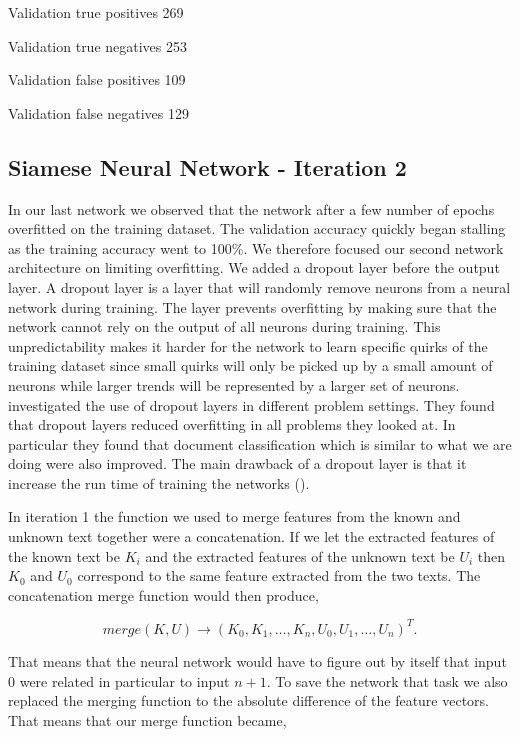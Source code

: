 Validation true positives 269

Validation true negatives 253

Validation false positives 109

Validation false negatives 129


\subsection{Siamese Neural Network - Iteration 2}


In our last network we observed that the network after a few number of epochs
overfitted on the training dataset. The validation accuracy quickly began
stalling as the training accuracy went to 100\%. We therefore focused our
second network architecture on limiting overfitting. We added a dropout layer
before the output layer. A dropout layer is a layer that will randomly remove
neurons from a neural network during training. The layer prevents overfitting
by making sure that the network cannot rely on the output of all neurons during
training. This unpredictability makes it harder for the network to learn
specific quirks of the training dataset since small quirks will only be picked
up by a small amount of neurons while larger trends will be represented by a
larger set of neurons. \cite{JMLR:v15:srivastava14a} investigated the use of
dropout layers in different problem settings. They found that dropout layers
reduced overfitting in all problems they looked at. In particular they found
that document classification which is similar to what we are doing were also
improved. The main drawback of a dropout layer is that it increase the run time
of training the networks (\cite{JMLR:v15:srivastava14a}).

In iteration 1 the function we used to merge features from the known and unknown
text together were a concatenation. If we let the extracted features of the
known text be $K_i$ and the extracted features of the unknown text be $U_i$ then
$K_0$ and $U_0$ correspond to the same feature extracted from the two texts. The
concatenation merge function would then produce,

\begin{equation}
    merge(K, U) \rightarrow \left(
        K_0, K_1, \dots, K_n, U_0, U_1, \dots, U_n
    \right)^T.
\end{equation}

That means that the neural network would have to figure out by itself that input
$0$ were related in particular to input $n + 1$. To save the network that task
we also replaced the merging function to the absolute difference of the feature
vectors. That means that our merge function became,

